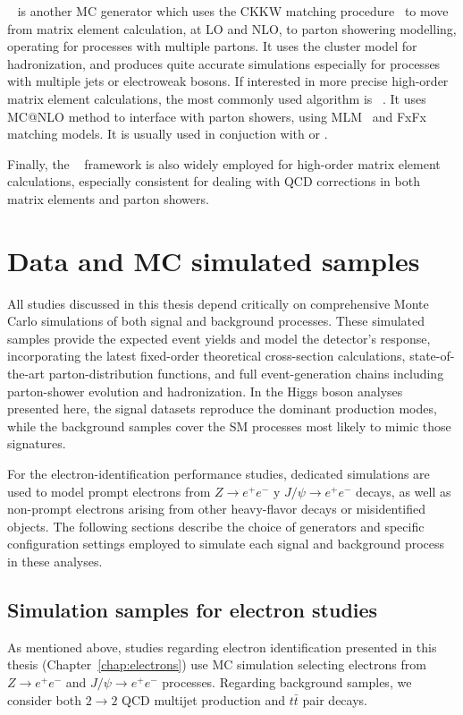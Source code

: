 \sherpa~\cite{Bothmann_2019} is another MC generator which uses the CKKW matching procedure~\cite{Lavesson_2008} to move from matrix element calculation, at LO and NLO, to parton showering modelling, operating for processes with multiple partons. It uses the cluster model for hadronization, and produces quite accurate simulations especially for processes with multiple jets or electroweak bosons. 
If interested in more precise high-order matrix element calculations, the most commonly used algorithm is \madgraph~\cite{Alwall_2014}. It uses \textsc{MC@NLO} method to interface with parton showers, using MLM~\cite{MANGANO2002343} and FxFx~\cite{Frederix_2012} matching models. It is usually used in conjuction with \pythia or \herwig.

Finally, the \powhegbox~\cite{Frixione_2007} framework is also widely employed for high-order matrix element calculations, especially consistent for dealing with QCD corrections in both matrix elements and parton showers.

\section{Data and MC simulated samples}
\label{sec:mc_samples}

All studies discussed in this thesis depend critically on comprehensive Monte Carlo simulations of both signal and background processes. These simulated samples provide the expected event yields and model the detector’s response, incorporating the latest fixed-order 
theoretical cross-section calculations, state-of-the-art parton-distribution functions, and full event-generation chains including parton-shower evolution and hadronization. In the Higgs boson analyses presented here, the signal datasets reproduce the dominant production modes, while the background samples cover the SM processes most likely to mimic those signatures.

For the electron-identification performance studies, dedicated simulations are used to model prompt electrons from $Z \rightarrow e^{+}e^{-} $ y $J/\psi \rightarrow e^{+}e^{-}$ decays, as well as non-prompt electrons arising from other heavy-flavor decays or misidentified objects. The following sections describe the choice of generators and specific configuration settings employed
to simulate each signal and background process in these analyses.

\subsection{Simulation samples for electron studies}
\label{subsec:electron_mc}
As mentioned above, studies regarding electron identification presented in this thesis (Chapter~\ref{chap:electrons}) use MC simulation selecting electrons from $Z \rightarrow e^{+}e^{-} $ and $J/\psi \rightarrow e^{+}e^{-}$ processes.
Regarding background samples, we consider both $2 \to 2$ QCD multijet production and $t\bar{t}$ pair decays.

